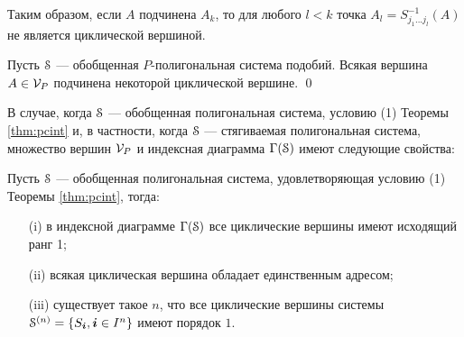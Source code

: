 Таким образом, если $A$ подчинена $A_k$, то для любого $l<k$ точка $A_l=S_{j_1...j_l}^{-1}(A)$ не является циклической вершиной.

\begin{proposition}\label{1ordcyc}
Пусть ${\EuScript S}$ --- обобщенная $P$-полигональная система подобий.
Всякая вершина $A\in {\mathcal V}_P$ подчинена некоторой циклической вершине. 
\qed 
\end{proposition}

В случае, когда ${\EuScript S}$ ---  обобщенная полигональная система, условию (1) Теоремы \ref{thm:pcint} и, в частности, когда ${\EuScript S}$ --- стягиваемая полигональная система,  множество вершин ${\mathcal V}_P$ и индексная диаграмма $\Gamma({\EuScript S})$ имеют следующие свойства: 


\begin{proposition}\label{rankcy}
Пусть  ${\EuScript S}$ ---  обобщенная полигональная система, удовлетворяющая  условию (1) Теоремы \ref{thm:pcint}, тогда:
\begin{itemize}[nolistsep]
    \item[(i)] в индексной диаграмме $\Gamma({\EuScript S})$ все циклические вершины имеют исходящий ранг 1;
    \item[(ii)] всякая циклическая вершина обладает единственным адресом;
    \item[(iii)] существует такое $n$, что все циклические вершины системы ${\EuScript S}^{(n)}=\{S_{\bm{i}},{\bm{i}}\in I^n\}$ имеют порядок $1$.
\end{itemize}

\end{proposition}

